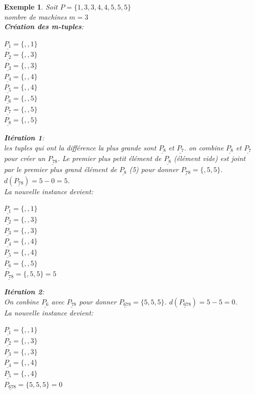 \documentclass[a4paper,12pt]{report}
\theoremstyle{plain}				%
\newtheorem{example}{Exemple}
\theoremstyle{definition}				%
\begin{document}
\begin{itemize}
\begin{example}
Soit $P=\{1,3,3,4,4,5,5,5\}$\\
nombre de machines $m=3$\\
\textbf{Création des m-tuples}:\\
\begin{multicols}{3}
$\underline{P_{1}} = \{,,1\}$\\
$\underline{P_{2}} = \{,,3\}$\\
$\underline{P_{3}} = \{,,3\}$\\
$\underline{P_{4}} = \{,,4\}$\\
$\underline{P_{5}} = \{,,4\}$\\
$\underline{P_{6}} = \{,,5\}$\\
$\underline{P_{7}} = \{,,5\}$\\
$\underline{P_{8}} = \{,,5\}$\\
\end{multicols}

\textbf{Itération 1}:\\
les tuples qui ont la différence la plus grande sont
$\underline{P_{8}}$  et $\underline{P_{7}}$.
on combine $\underline{P_{8}}$  et $\underline{P_{7}}$ pour créer un $\underline{P_{78}}$. Le premier plus petit élément de $\underline{P_{8}}$ (élément vide) est joint par le premier plus grand élément de $\underline{P_{8}}$ (5) pour donner  $\underline{P_{78}} = \{,5,5\}$. $d(\underline{P_{78}}) = 5-0 = 5$.\\
La nouvelle instance devient:\\
\begin{multicols}{3}
$\underline{P_{1}} = \{,,1\}$\\
$\underline{P_{2}} = \{,,3\}$\\
$\underline{P_{3}} = \{,,3\}$\\
$\underline{P_{4}} = \{,,4\}$\\
$\underline{P_{5}} = \{,,4\}$\\
$\underline{P_{6}} = \{,,5\}$\\
$\underline{P_{78}} = \{,5,5\}=5$\\
\end{multicols}

\textbf{Itération 2}:\\
On conbine $\underline{P_{6}}$ avec $\underline{P_{78}}$ pour donner $\underline{P_{678}} = \{5,5,5\}$. $d(\underline{P_{678}}) = 5-5 = 0$.\\
La nouvelle instance devient:\\
\begin{multicols}{3}
$\underline{P_{1}} = \{,,1\}$\\
$\underline{P_{2}} = \{,,3\}$\\
$\underline{P_{3}} = \{,,3\}$\\
$\underline{P_{4}} = \{,,4\}$\\
$\underline{P_{5}} = \{,,4\}$\\
$\underline{P_{678}} = \{5,5,5\}=0$\\
\end{multicols}


\end{example}
\end{itemize}
\end{document}
